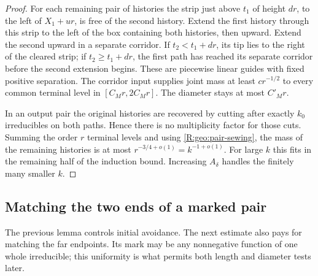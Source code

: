 \begin{proof}
For each remaining pair of histories the strip just above $t_1$ of
height $dr$, to the left of $X_1+ur$, is free of the second history.
Extend the first history through this strip to the left of the box
containing both histories, then upward.  Extend the second upward in
a separate corridor.  If $t_2<t_1+dr$, its tip lies to the right of
the cleared strip; if $t_2\ge t_1+dr$, the first path has reached
its separate corridor before the second extension begins.  These are
piecewise linear guides with fixed positive separation.  The corridor
input supplies joint mass at least $c r^{-1/2}$ to every common
terminal level in $[C_Mr,2C_Mr]$.  The diameter stays at most $C'_Mr$.

In an output pair the original histories are recovered by cutting
after exactly $k_0$ irreducibles on both paths.  Hence there is no
multiplicity factor for those cuts.  Summing the order $r$ terminal
levels and using \eqref{R:geo:pair-sewing}, the mass of the remaining
histories is at most $r^{-3/4+o(1)}=k^{-1+o(1)}$.  For large $k$
this fits in the remaining half of the induction bound.  Increasing
$A_\delta$ handles the finitely many smaller $k$.
\end{proof}

\subsection{Matching the two ends of a marked pair}
\label{R:geo:matching-section}

The previous lemma controls initial avoidance.  The next estimate also
pays for matching the far endpoints.  Its mark may be any nonnegative
function of one whole irreducible; this uniformity is what permits both
length and diameter tests later.

